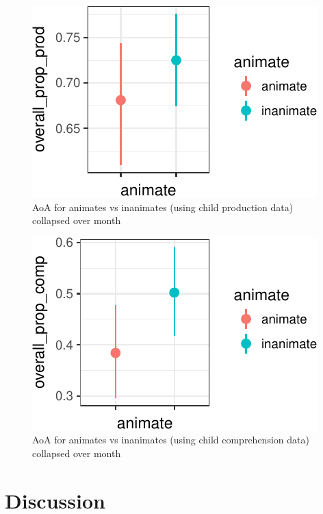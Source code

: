 \documentclass[10pt, letterpaper]{article}
\newenvironment{CodeChunk}{}{}
\begin{document}
\begin{CodeChunk}
\begin{figure}[tb]
\includegraphics{figs/animacy-aoa-prod-graph-1} \caption[AoA for animates vs inanimates (using child production data) collapsed over month]{AoA for animates vs inanimates (using child production data) collapsed over month}\label{fig:animacy-aoa-prod-graph}
\end{figure}
\end{CodeChunk}

\begin{CodeChunk}
\begin{figure}[tb]
\includegraphics{figs/animacy-aoa-comp-graph-1} \caption[AoA for animates vs inanimates (using child comprehension data) collapsed over month]{AoA for animates vs inanimates (using child comprehension data) collapsed over month}\label{fig:animacy-aoa-comp-graph}
\end{figure}
\end{CodeChunk}

\section{Discussion}\label{discussion}
\end{document}
